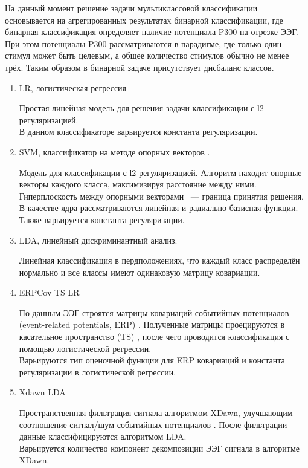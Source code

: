 \documentclass[12pt]{article}
\begin{document}
	На данный момент решение задачи мультиклассовой классификации основывается на агрегированных результатах бинарной классификации, где бинарная классификация определяет наличие потенциала P300 на отрезке ЭЭГ.
	При этом потенциалы P300 рассматриваются в парадигме, где только один стимул может быть целевым, а общее количество стимулов обычно не менее трёх.  Таким образом в бинарной задаче присутствует дисбаланс классов.  
	
	\begin{enumerate}
		\item LR, логистическая регрессия \cite{scikit-learn}
		
		Простая линейная модель для решения задачи классификации с l2-регуляризацией.\\
		В данном классификаторе варьируется константа регуляризации.
		
		
		\item SVM, классификатор на методе опорных векторов \cite{scikit-learn}. 
		
		Модель для классификации с l2-регуляризацией. Алгоритм находит опорные векторы каждого класса, максимизируя расстояние между ними. Гиперплоскость между опорными векторами ~--- граница принятия решения.\\
		В качестве ядра рассматриваются линейная и радиально-базисная функции. Также варьируется константа регуляризации.
		
		
		\item LDA, линейный дискриминантный анализ.
		
		Линейная классификация в пердположениях, что каждый класс распределён нормально и все классы имеют одинаковую матрицу ковариации.\cite{scikit-learn}
		
		\item ERPCov TS LR
		
		По данным ЭЭГ строятся матрицы ковариаций событийных потенциалов (event-related potentials, ERP) \cite{PyRiemann}. Полученные матрицы проецируются в касательное пространство (TS) \cite{PyRiemann}, после чего проводится классификация с помощью логистической регрессии.\\
		Варьируются тип оценочной функции для ERP ковариаций и константа регуляризации в логистической регрессии.
		
		\item Xdawn LDA
		
		Пространственная фильтрация сигнала алгоритмом XDawn, улучшающим соотношение сигнал/шум событийных потенциалов \cite{PyRiemann}. После фильтрации данные классифицируются алгоритмом LDA.\\
		Варьируется количество компонент декомпозиции ЭЭГ сигнала в алгоритме XDawn.
		

\end{enumerate}
\end{document}
